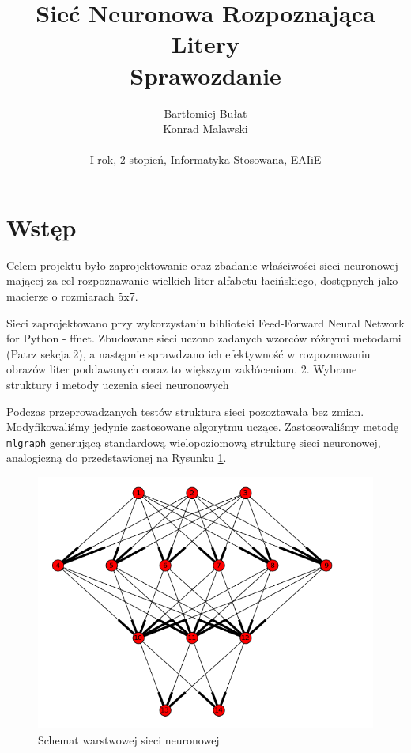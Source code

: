 \documentclass[a4paper]{article}
\title{Sieć Neuronowa Rozpoznająca Litery \\ Sprawozdanie}
\author{
Bartłomiej Bułat\\
Konrad Malawski\\
\\
I rok, 2 stopień, Informatyka Stosowana, EAIiE}
\begin{document}
\maketitle

\makeindex

\newpage
\section{Wstęp}

Celem projektu było zaprojektowanie oraz zbadanie właściwości sieci neuronowej mającej za cel rozpoznawanie wielkich liter alfabetu łacińskiego, 
dostępnych jako macierze o rozmiarach 5x7. 

Sieci zaprojektowano przy wykorzystaniu biblioteki Feed-Forward Neural Network for Python - ffnet. Zbudowane sieci uczono zadanych wzorców różnymi 
metodami (Patrz sekcja 2), a następnie sprawdzano ich efektywność w rozpoznawaniu obrazów liter poddawanych coraz to większym zakłóceniom.
2. Wybrane struktury i metody uczenia sieci neuronowych

Podczas przeprowadzanych testów struktura sieci pozoztawała bez zmian. Modyfikowaliśmy jedynie zastosowane algorytmu uczące. Zastosowaliśmy metodę
\verb|mlgraph| generującą standardową wielopoziomową strukturę sieci neuronowej, analogiczną do przedstawionej na Rysunku \ref{rys:graf}.

\begin{figure}[pht]
 \centering
 \includegraphics[scale=0.34]{mlgraph}
 \caption{Schemat warstwowej sieci neuronowej}\label{rys:graf}
\end{figure}
\end{document}
